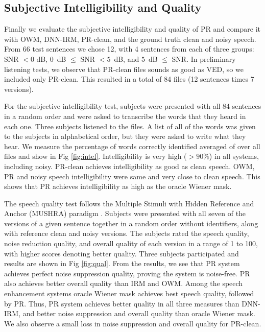 \documentclass{article}
\begin{document}
\subsection{Subjective Intelligibility and Quality}

Finally we evaluate the subjective intelligibility and quality of PR and compare it with OWM, DNN-IRM, PR-clean, and the ground truth clean and noisy speech. From 66 test sentences we chose 12, with 4 sentences from each of three groups: SNR $< 0$ dB, $0$~dB $\leq$ SNR $< 5$~dB, and $5$~dB $\leq$ SNR. In preliminary listening tests, we observe that PR-clean files sounds as good as VED, so we included only PR-clean.  This resulted in a total of 84 files (12 sentences times 7 versions).

For the subjective intelligibility test, subjects were presented with all 84 sentences in a random order and were asked to transcribe the words that they heard in each one.  Three subjects listened to the files. A list of all of the words was given to the subjects in alphabetical order, but they were asked to write what they hear. We measure the percentage of words correctly identified averaged of over all files and show in Fig \ref{fig:intel}. Intelligibility is very high ($>90\%$) in all systems, including noisy. PR-clean achieves intelligibility as good as clean speech. OWM, PR and noisy speech intelligibility were same and very close to clean speech. This shows that PR achieves intelligibility as high as the oracle Wiener mask.

The speech quality test follows the Multiple Stimuli with Hidden Reference and Anchor (MUSHRA) paradigm \cite{MUSHRA}. Subjects were presented with all seven of the versions of a given sentence together in a random order without identifiers, along with reference clean and noisy versions. The subjects rated the speech quality, noise reduction quality, and overall quality of each version in a range of 1 to 100, with higher scores denoting better quality. Three subjects participated and results are shown in Fig \ref{fig:qual}.
From the results, we see that PR system achieves perfect noise suppression quality, proving the system is noise-free. PR also achieves better overall quality than IRM and OWM. Among the speech enhancement systems oracle Wiener mask achieves best speech quality, followed by PR. Thus, PR system achieves better quality in all three measures than DNN-IRM, and better noise suppression and overall quality than oracle Wiener mask. We also observe a small loss in noise suppression and overall quality for PR-clean. 
\end{document}
